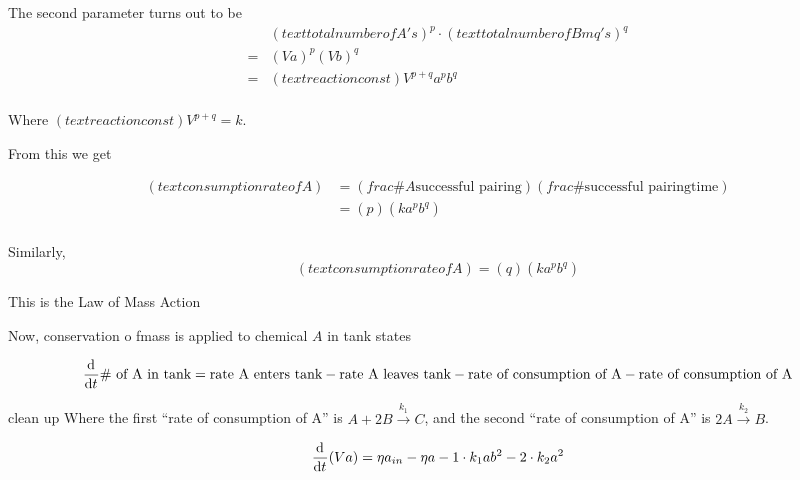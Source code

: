 \documentclass[12pt]{article}
\begin{document}
The second parameter turns out to be
\begin{equation}
  \begin{aligned}
    &\left(text{total number of A's}\right)^p \cdot \left(text{total number of Bmq's}\right)^q \\
    = &(Va)^p(Vb)^q \\
    = & \left(text{reaction const}\right)V^{p+q} a^p b^q \\
  \end{aligned}
\end{equation}

Where $\left(text{reaction const}\right)V^{p+q} = k$.

From this we get

\begin{equation}
  \begin{aligned}
    \left(text{consumption rate of }A\right) &= \left(frac{\text{\# }A}{\text{successful pairing}}\right)
    \left(frac{\text{\# successful pairing}}{\text{time}}\right) \\
    &= (p) (ka^pb^q) \\
  \end{aligned}
\end{equation}

Similarly,
\begin{equation}
  \left(text{consumption rate of }A\right) = (q)(ka^pb^q)
\end{equation}

This is the Law of Mass Action

Now, conservation o fmass is applied to chemical $A$ in tank states

\begin{equation}
  \begin{aligned}
    \frac{\mathrm{d}^{} {}}{\mathrm{d}{t}^{}}\text{\# of A in tank} = \text{rate A enters tank} - \text{rate A leaves tank} - \text{rate of consumption of A} - \text{rate of consumption of A}
  \end{aligned}
\end{equation}

\todo clean up
Where the first ``rate of consumption of A'' is $A + 2B \xrightarrow{k_1} C$,
and the second ``rate of consumption of A'' is $2A \xrightarrow{k_2} B$.

\begin{equation}
  \begin{aligned}
    \frac{\mathrm{d}^{} {}}{\mathrm{d}{t}^{}}(Va) = \eta a_{in} - \eta a - 1\cdot k_1ab^2 - 2\cdot k_2a^2
  \end{aligned}
\end{equation}
\end{document}
